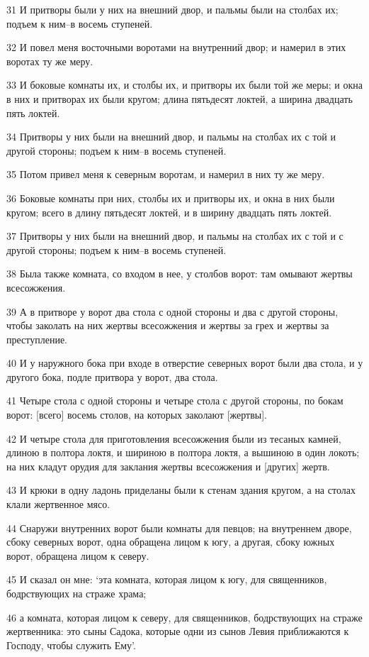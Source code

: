 \par 31 И притворы были у них на внешний двор, и пальмы были на столбах их; подъем к ним--в восемь ступеней.
\par 32 И повел меня восточными воротами на внутренний двор; и намерил в этих воротах ту же меру.
\par 33 И боковые комнаты их, и столбы их, и притворы их были той же меры; и окна в них и притворах их были кругом; длина пятьдесят локтей, а ширина двадцать пять локтей.
\par 34 Притворы у них были на внешний двор, и пальмы на столбах их с той и другой стороны; подъем к ним--в восемь ступеней.
\par 35 Потом привел меня к северным воротам, и намерил в них ту же меру.
\par 36 Боковые комнаты при них, столбы их и притворы их, и окна в них были кругом; всего в длину пятьдесят локтей, и в ширину двадцать пять локтей.
\par 37 Притворы у них были на внешний двор, и пальмы на столбах их с той и с другой стороны; подъем к ним--в восемь ступеней.
\par 38 Была также комната, со входом в нее, у столбов ворот: там омывают жертвы всесожжения.
\par 39 А в притворе у ворот два стола с одной стороны и два с другой стороны, чтобы заколать на них жертвы всесожжения и жертвы за грех и жертвы за преступление.
\par 40 И у наружного бока при входе в отверстие северных ворот были два стола, и у другого бока, подле притвора у ворот, два стола.
\par 41 Четыре стола с одной стороны и четыре стола с другой стороны, по бокам ворот: [всего] восемь столов, на которых заколают [жертвы].
\par 42 И четыре стола для приготовления всесожжения были из тесаных камней, длиною в полтора локтя, и шириною в полтора локтя, а вышиною в один локоть; на них кладут орудия для заклания жертвы всесожжения и [других] жертв.
\par 43 И крюки в одну ладонь приделаны были к стенам здания кругом, а на столах клали жертвенное мясо.
\par 44 Снаружи внутренних ворот были комнаты для певцов; на внутреннем дворе, сбоку северных ворот, одна обращена лицом к югу, а другая, сбоку южных ворот, обращена лицом к северу.
\par 45 И сказал он мне: `эта комната, которая лицом к югу, для священников, бодрствующих на страже храма;
\par 46 а комната, которая лицом к северу, для священников, бодрствующих на страже жертвенника: это сыны Садока, которые одни из сынов Левия приближаются к Господу, чтобы служить Ему'.
